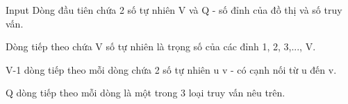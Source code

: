 Input
Dòng đầu tiên chứa 2 số tự nhiên V và Q - số đỉnh của đồ thị và số truy vấn.

Dòng tiếp theo chứa V số tự nhiên là trọng số của các đỉnh 1, 2, 3,..., V.

V-1 dòng tiếp theo mỗi dòng chứa 2 số tự nhiên u v - có cạnh nối từ u đến v.

Q dòng tiếp theo mỗi dòng là một trong 3 loại truy vấn nêu trên.